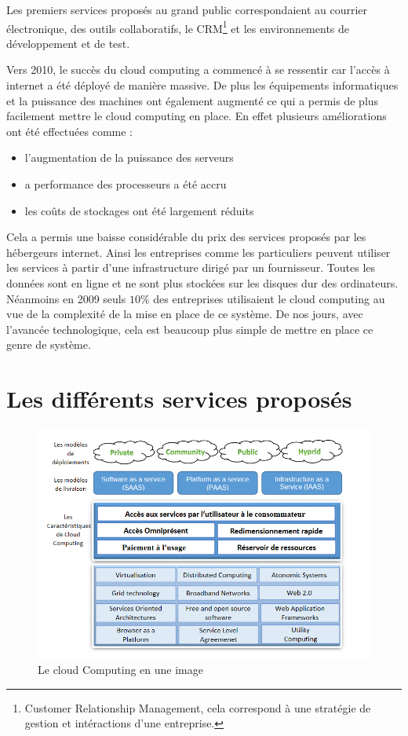\documentclass[a4 paper, 12 pt]{article}
\begin{document}
Les premiers services proposés au grand public correspondaient au courrier électronique, des outils collaboratifs, le CRM\footnote{Customer Relationship Management, cela correspond à une stratégie de gestion et intéractions d'une entreprise.} et les environnements de développement et de test.

Vers 2010, \cite{WikiHistoire} le succès du cloud computing a commencé à se ressentir car l’accès à internet a été déployé de manière massive. De plus les équipements informatiques et la puissance des machines ont également augmenté ce qui a permis de plus facilement mettre le cloud computing en place. En effet plusieurs améliorations ont été effectuées comme : 
\begin{itemize}

	 \item l’augmentation de la puissance des serveurs 
	 \item a performance des processeurs a été accru
	 \item les coûts de stockages ont été largement réduits

\end{itemize}
\vspace{0.5cm}


 Cela a permis une baisse considérable du prix des services proposés par les hébergeurs internet. Ainsi les entreprises comme les particuliers peuvent utiliser les services à partir d’une infrastructure dirigé par un fournisseur. Toutes les données sont en ligne et ne sont plus stockées sur les disques dur des ordinateurs. Néanmoins en 2009 seuls $10\%$  des entreprises utilisaient le cloud computing au vue de la complexité de la mise en place de ce système. De nos jours, avec l’avancée technologique, cela est beaucoup plus simple de mettre en place ce genre de système.


\section{Les différents services proposés }


\begin{figure} [h] 
\includegraphics[scale=0.5]{CP2.png} 
\caption{ Le cloud Computing en une image \cite{barkat2018composition}}
\label{1}
\end{figure}
\end{document}
